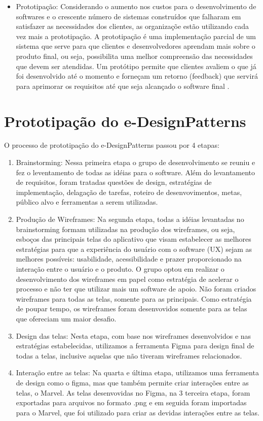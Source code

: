 \begin{itemize}
	\item Prototipação: Considerando o aumento nos custos para o desenvolvimento de softwares e o crescente número de sistemas construídos que falharam em satisfazer as necessidades dos clientes, as organizaçõe estão utilizando cada vez mais a prototipação. A prototipação é  uma implementação parcial de um sistema que serve para que clientes e desenvolvedores aprendam mais sobre o produto final, ou seja, possibilita uma melhor compreensão das necessidades que devem ser atendidas. Um protótipo permite que clientes avaliem o que já foi desenvolvido até o momento e forneçam um retorno (feedback) que servirá para aprimorar os requisitos até que seja alcançado o software final \cite{davis1992operational}. 
\end{itemize}

\section{Prototipação do e-DesignPatterns}

O processo de prototipação do e-DesignPatterns passou por 4 etapas:

\begin{enumerate}
	\item Brainstorming: Nessa primeira etapa o grupo de desenvolvimento se reuniu e fez o leventamento de todas as idéias para o software. Além do levantamento de requisitos, foram tratadas questões de design, estratégias de implementação, delagação de tarefas, roteiro de desenvovimentos, metas, público alvo e ferramentas a serem utilizadas. 
	\item Produção de Wireframes: Na segunda etapa, todas a idéias levantadas no brainstorming formam utilizadas na produção dos wireframes, ou seja, esboços das principais telas do aplicativo que visam estabelecer as melhores estratégias para que a experiência do usuário com o software (UX) sejam as melhores possíveis: usabilidade, acessibilidade e prazer proporcionado na interação entre o usuário e o produto. O grupo optou em realizar o desenvolvimento dos wireframes em papel como estratégia de acelerar o processo e não ter que utilizar mais um software de apoio. Não foram criados wireframes para todas as telas, somente para as principais. Como estratégia de poupar tempo, os wireframes foram desenvovidos somente para as telas que ofereciam um maior desafio.
	\item Design das telas: Nesta etapa, com base nos wireframes desenvolvidos e nas estratégias estabelecidas, utilizamos a ferramenta Figma para design final de todas a telas, inclusive aquelas que não tiveram wireframes relacionados. 
	\item Interação entre as telas: Na quarta e última etapa, utilizamos uma ferramenta de design como o figma, mas que também permite criar interações entre as telas, o Marvel. As telas desenvovidas no Figma, na 3 terceira etapa, foram exportadas para arquivos no formato .png e em seguida foram importadas para o Marvel, que foi utilizado para criar as devidas interações entre as telas.
\end{enumerate}


